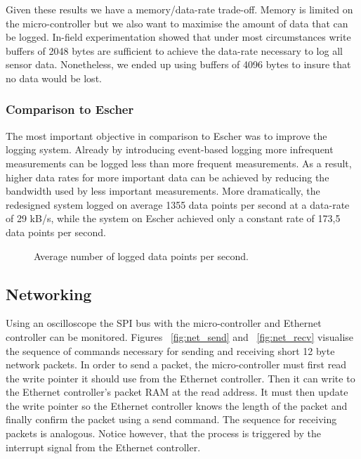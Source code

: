 Given these results we have a memory/data-rate trade-off. Memory is limited on the micro-controller but we also want to maximise the amount of data that can be logged. In-field experimentation showed that under most circumstances write buffers of 2048 bytes are sufficient to achieve the data-rate necessary to log all sensor data. Nonetheless, we ended up using buffers of 4096 bytes to insure that no data would be lost.

\subsubsection{Comparison to Escher}

The most important objective in comparison to Escher was to improve the logging system. Already by introducing event-based logging more infrequent measurements can be logged less than more frequent measurements. As a result, higher data rates for more important data can be achieved by reducing the bandwidth used by less important measurements. More dramatically, the redesigned system logged on average 1355 data points per second at a data-rate of 29 kB/s, while the system on Escher achieved only a constant rate of 173,5 data points per second.

\begin{figure}[H]
\centering
{}
\caption{Average number of logged data points per second.}
\label{fig:write_speed}
\end{figure}

\subsection{Networking}

Using an oscilloscope the SPI bus with the micro-controller and Ethernet controller can be monitored. Figures ~\ref{fig:net_send} and ~\ref{fig:net_recv} visualise the sequence of commands necessary for sending and receiving short 12 byte network packets. In order to send a packet, the micro-controller must first read the write pointer it should use from the Ethernet controller. Then it can write to the Ethernet controller's packet RAM at the read address. It must then update the write pointer so the Ethernet controller knows the length of the packet and finally confirm the packet using a send command. The sequence for receiving packets is analogous. Notice however, that the process is triggered by the interrupt signal from the Ethernet controller.

